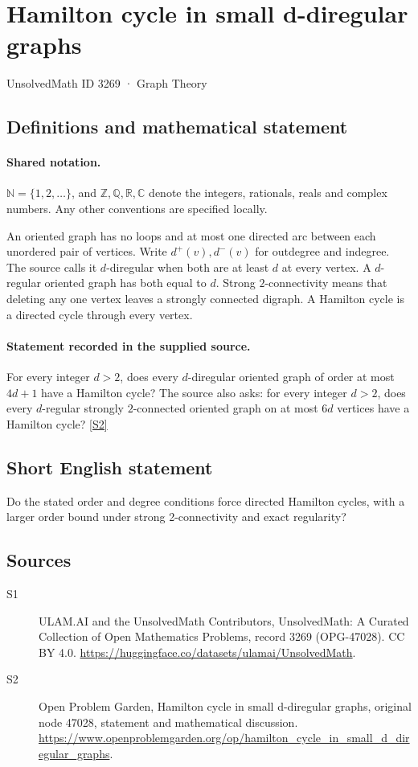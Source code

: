 \documentclass[11pt]{article}
\newcommand{\sref}[2]{\hyperlink{source:#1:#2}{[S#2]}}
\begin{document}
\setcounter{section}{3268}
\section{Hamilton cycle in small d-diregular graphs}\label{3269}
{\small\sffamily UnsolvedMath ID 3269 · Graph Theory}
\subsection{Definitions and mathematical statement}

\paragraph{Shared notation.}$\mathbb N=\{1,2,\ldots\}$, and $\mathbb Z,\mathbb Q,\mathbb R,\mathbb C$ denote the integers, rationals, reals and complex numbers. Any other conventions are specified locally.


An oriented graph has no loops and at most one directed arc between each unordered pair of vertices. Write $d^+(v),d^-(v)$ for outdegree and indegree. The source calls it $d$-diregular when both are at least $d$ at every vertex. A $d$-regular oriented graph has both equal to $d$. Strong $2$-connectivity means that deleting any one vertex leaves a strongly connected digraph. A Hamilton cycle is a directed cycle through every vertex.
\paragraph{Statement recorded in the supplied source.}
For every integer $d>2$, does every $d$-diregular oriented graph of order at most $4d+1$ have a Hamilton cycle? The source also asks: for every integer $d>2$, does every $d$-regular strongly $2$-connected oriented graph on at most $6d$ vertices have a Hamilton cycle? \sref{3269}{2}
\subsection{Short English statement}
Do the stated order and degree conditions force directed Hamilton cycles, with a larger order bound under strong 2-connectivity and exact regularity?
\subsection{Sources}
\begin{description}
\item[\hypertarget{source:3269:1}{S1}] ULAM.AI and the UnsolvedMath Contributors, UnsolvedMath: A Curated Collection of Open Mathematics Problems, record 3269 (OPG-47028). CC BY 4.0. \url{https://huggingface.co/datasets/ulamai/UnsolvedMath}.
\item[\hypertarget{source:3269:2}{S2}] Open Problem Garden, Hamilton cycle in small d-diregular graphs, original node 47028, statement and mathematical discussion. \url{https://www.openproblemgarden.org/op/hamilton_cycle_in_small_d_diregular_graphs}.
\end{description}
\label{end:3269}
\end{document}
